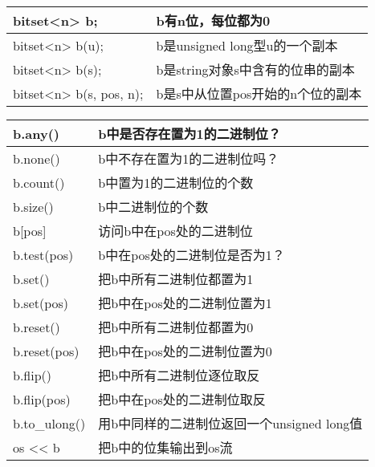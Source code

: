 \begin{table}[!htbp]
\centering
\begin{tabular}{|l|l|}
\hline
bitset<n> b; & b有n位，每位都为0 \\ \hline
bitset<n> b(u); & b是unsigned long型u的一个副本 \\ \hline
bitset<n> b(s); & b是string对象s中含有的位串的副本 \\ \hline
bitset<n> b(s, pos, n); & b是s中从位置pos开始的n个位的副本 \\ \hline
\end{tabular}
\end{table}

\begin{table}[!htbp]
\centering
\begin{tabular}{|l|l|}
\hline
b.any() & b中是否存在置为1的二进制位？ \\ \hline
b.none() & b中不存在置为1的二进制位吗？ \\ \hline
b.count() & b中置为1的二进制位的个数 \\ \hline
b.size() & b中二进制位的个数 \\ \hline
b[pos] & 访问b中在pos处的二进制位 \\ \hline
b.test(pos) & b中在pos处的二进制位是否为1？ \\ \hline
b.set() & 把b中所有二进制位都置为1 \\ \hline
b.set(pos) & 把b中在pos处的二进制位置为1 \\ \hline
b.reset() & 把b中所有二进制位都置为0 \\ \hline
b.reset(pos) & 把b中在pos处的二进制位置为0 \\ \hline
b.flip() & 把b中所有二进制位逐位取反 \\ \hline
b.flip(pos) & 把b中在pos处的二进制位取反 \\ \hline
b.to\_ulong() & 用b中同样的二进制位返回一个unsigned long值 \\ \hline
os << b & 把b中的位集输出到os流 \\ \hline
\end{tabular}
\end{table}
